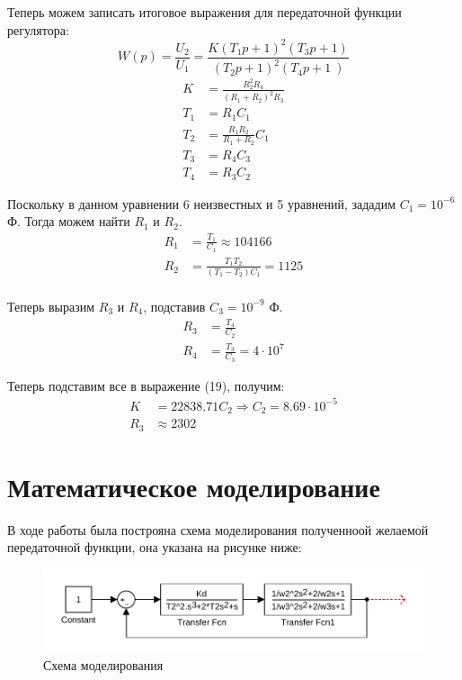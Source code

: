 \documentclass[russian, utf8]{eskdtext}
\begin{document}
Теперь можем записать итоговое выражения для передаточной функции регулятора:
\begin{equation}
    W(p) = \frac{U_2}{U_1} = \frac{K\left(T_1p + 1 \right)^2 \left( T_3p + 1 \right)}{\left( T_2p + 1 \right)^2 \left( T_4p + 1 \ \right)} 
\end{equation}
\begin{align}
    K & = \frac{R_2^2R_4}{(R_1 + R_2)^2R_3} \\
    T_1 & = R_1C_1 \\
    T_2 & = \frac{R_1R_2}{R_1 + R_2}C_1 \\
    T_3 & = R_4C_3 \\
    T_4 & = R_3C_2
\end{align}

Поскольку в данном уравнении 6 неизвестных и 5 уравнений, зададим $C_1 = 10^{-6}$ Ф. Тогда можем найти $R_1$ и $R_2$.
\begin{align*}
    R_1 & = \frac{T_1}{C_1} \approx 104166 \\
    R_2 & = \frac{T_1T_2}{(T_1 - T_2)C_1} = 1125 \\
\end{align*}

\newpage
Теперь выразим $R_3$ и $R_4$, подставив $C_3 = 10^{-9}$ Ф.
\begin{align*}
    R_3 & = \frac{T_4}{C_2} \\
    R_4 & = \frac{T_3}{C_3} = 4\cdot 10^7
\end{align*}

Теперь подставим все в выражение (19), получим:
\begin{align*}
    K & = 22838.71C_2 \Rightarrow C_2 = 8.69 \cdot 10^{-5} \\
    R_3 & \approx 2302
\end{align*}


\section{Математическое моделирование}

В ходе работы была построяна схема моделирования полученноой желаемой передаточной функции, она указана на рисунке ниже: 
\begin{figure}[h!]
    \centering
    \includegraphics {images/model.pdf} 
    \caption{Схема моделирования}
\end{figure} \par
\end{document}
